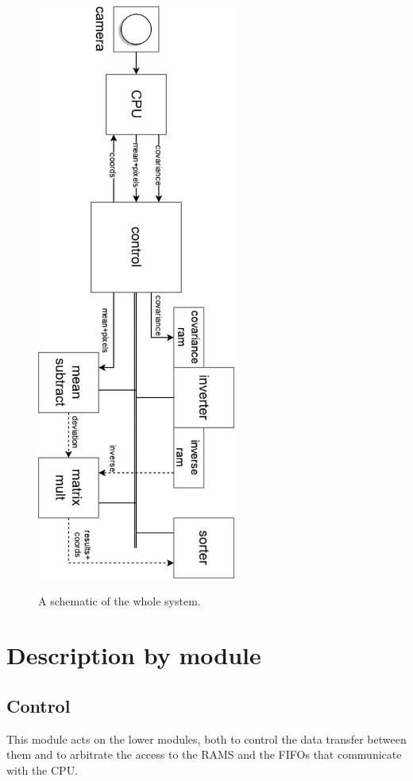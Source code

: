 \begin{figure}
\centering\textbf{
\includegraphics[height=7.5in]{figures/bus.png}}
\caption{A schematic of the whole system.}
  \label{fig:bus}
\end{figure}
\clearpage
\pagebreak

\section{Description by module}
\subsection{Control}
This module acts on the lower modules, both to control the data transfer between them and to arbitrate the access to the RAMS and the FIFOs that communicate with the CPU.

